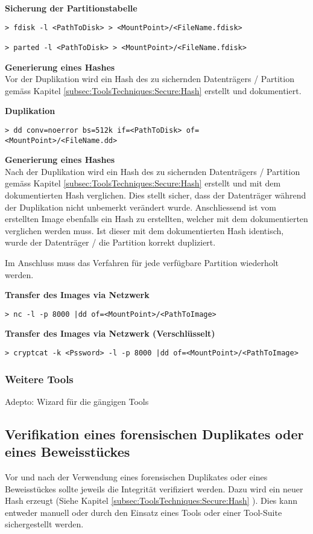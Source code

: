 \textbf{Sicherung der Partitionstabelle}
\begin{lstlisting}
> fdisk -l <PathToDisk> > <MountPoint>/<FileName.fdisk>

> parted -l <PathToDisk> > <MountPoint>/<FileName.fdisk>
\end{lstlisting}

\textbf{Generierung eines Hashes}\\
Vor der Duplikation wird ein Hash des zu sichernden Datenträgers / Partition gemäss Kapitel \ref{subsec:ToolsTechniques:Secure:Hash}  erstellt und dokumentiert.

\textbf{Duplikation}
\begin{lstlisting}
> dd conv=noerror bs=512k if=<PathToDisk> of=<MountPoint>/<FileName.dd>
\end{lstlisting}

\textbf{Generierung eines Hashes}\\
Nach der Duplikation wird ein Hash des zu sichernden Datenträgers / Partition gemäss Kapitel \ref{subsec:ToolsTechniques:Secure:Hash}  erstellt und mit dem dokumentierten Hash verglichen. Dies stellt sicher, dass der Datenträger während der Duplikation nicht unbemerkt verändert wurde. Anschliessend ist vom erstellten Image ebenfalls ein Hash zu erstellten, welcher mit dem dokumentierten verglichen werden muss. Ist dieser mit dem dokumentierten Hash identisch, wurde der Datenträger / die Partition korrekt dupliziert.

Im Anschluss muss das Verfahren für jede verfügbare Partition wiederholt werden.

\textbf{Transfer des Images via Netzwerk}
\begin{lstlisting}
> nc -l -p 8000 |dd of=<MountPoint>/<PathToImage>
\end{lstlisting}

\textbf{Transfer des Images via Netzwerk (Verschlüsselt)}
\begin{lstlisting}
> cryptcat -k <Pssword> -l -p 8000 |dd of=<MountPoint>/<PathToImage>
\end{lstlisting}

\subsubsection{Weitere Tools}
Adepto: Wizard für die gängigen Tools




\subsection{Verifikation eines forensischen Duplikates oder eines Beweisstückes}
Vor und nach der Verwendung eines forensischen Duplikates oder eines Beweisstückes sollte jeweils die Integrität verifiziert werden. Dazu wird ein neuer Hash erzeugt (Siehe Kapitel \ref{subsec:ToolsTechniques:Secure:Hash} ). Dies kann entweder manuell oder durch den Einsatz eines Tools oder einer Tool-Suite sichergestellt werden.

